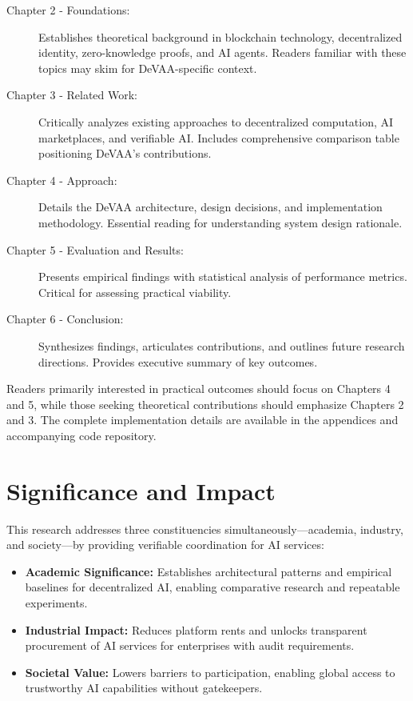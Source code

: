 \begin{description}
    \item[Chapter 2 - Foundations:] Establishes theoretical background in blockchain technology, decentralized identity, zero-knowledge proofs, and AI agents. Readers familiar with these topics may skim for DeVAA-specific context.
    
    \item[Chapter 3 - Related Work:] Critically analyzes existing approaches to decentralized computation, AI marketplaces, and verifiable AI. Includes comprehensive comparison table positioning DeVAA's contributions.
    
    \item[Chapter 4 - Approach:] Details the DeVAA architecture, design decisions, and implementation methodology. Essential reading for understanding system design rationale.
    
    \item[Chapter 5 - Evaluation and Results:] Presents empirical findings with statistical analysis of performance metrics. Critical for assessing practical viability.
    
    \item[Chapter 6 - Conclusion:] Synthesizes findings, articulates contributions, and outlines future research directions. Provides executive summary of key outcomes.
\end{description}

Readers primarily interested in practical outcomes should focus on Chapters 4 and 5, while those seeking theoretical contributions should emphasize Chapters 2 and 3. The complete implementation details are available in the appendices and accompanying code repository.

\section{Significance and Impact}

This research addresses three constituencies simultaneously—academia, industry, and society—by providing verifiable coordination for AI services:
\begin{itemize}
    \item \textbf{Academic Significance:} Establishes architectural patterns and empirical baselines for decentralized AI, enabling comparative research and repeatable experiments.
    \item \textbf{Industrial Impact:} Reduces platform rents and unlocks transparent procurement of AI services for enterprises with audit requirements.
    \item \textbf{Societal Value:} Lowers barriers to participation, enabling global access to trustworthy AI capabilities without gatekeepers.
\end{itemize}

